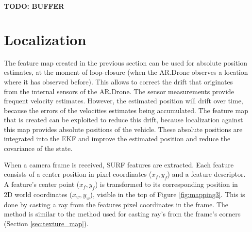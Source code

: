 \textbf{TODO: BUFFER}

	\section{Localization}
\label{sec:localization}

The feature map created in the previous section can be used for absolute position estimates, at the moment of loop-closure (when the AR.Drone observes a location where it has observed before).
This allows to correct the drift that originates from the internal sensors of the AR.Drone.
The
sensor measurements provide frequent velocity estimates.
However, the estimated position will drift over time, because the errors of the
velocities estimates
being accumulated.
The feature map that is created can be exploited to reduce this drift, because localization against this map provides absolute positions of the vehicle.
These absolute positions are integrated into the EKF and improve the estimated position and reduce the covariance of the state.

When a camera frame is received, SURF features are extracted.
Each feature consists of a center position in pixel coordinates ($x_f, y_f$) and a feature descriptor.
A feature's center point ($x_f, y_f$) is transformed to its corresponding position in 2D world coordinates ($x_w, y_w$), visible in the top of Figure \ref{fig:mapping3}.
This is done by casting a ray from the features pixel coordinates in the frame.
The method is similar to the method used for casting ray's from the frame's corners (Section \ref{sec:texture_map}).

